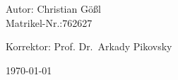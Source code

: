 \begin{titlepage}
\begin{center}
\begin{minipage}{0.45\textwidth}
\begin{flushleft} \normalsize 
Autor: Christian Gößl\\
Matrikel-Nr.:762627
\end{flushleft}
\end{minipage}
\hfill
\begin{minipage}{0.45\textwidth}
\begin{flushright} \normalsize 
\begin{flushleft}
Korrektor: Prof. Dr.~Arkady Pikovsky\\
\end{flushleft}
\end{flushright}
\end{minipage}

\vfill
{\normalsize  \today}
\vspace*{4.5cm}


\end{center}

\end{titlepage}